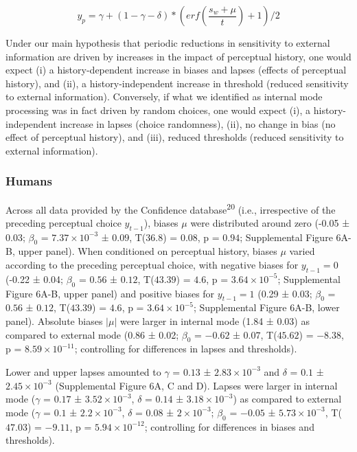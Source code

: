 \documentclass[
]{article}
\begin{document}
\begin{equation}
y_p = \gamma + (1 - \gamma - \delta) *  (erf(\frac{s_w + \mu}{t}) + 1) / 2
\end{equation}

Under our main hypothesis that periodic reductions in sensitivity to
external information are driven by increases in the impact of perceptual
history, one would expect (i) a history-dependent increase in biases and
lapses (effects of perceptual history), and (ii), a history-independent
increase in threshold (reduced sensitivity to external information).
Conversely, if what we identified as internal mode processing was in
fact driven by random choices, one would expect (i), a
history-independent increase in lapses (choice randomness), (ii), no
change in bias (no effect of perceptual history), and (iii), reduced
thresholds (reduced sensitivity to external information).

\hypertarget{humans}{%
\subsubsection{Humans}\label{humans}}

Across all data provided by the Confidence database\textsuperscript{20}
(i.e., irrespective of the preceding perceptual choice \(y_{t-1}\)),
biases \(\mu\) were distributed around zero (-0.05 ± 0.03; \(\beta_0\) =
\(\ensuremath{7.37\times 10^{-3}}\) ± \(0.09\), T(\(36.8\)) = \(0.08\),
p = \(0.94\); Supplemental Figure 6A-B, upper panel). When conditioned
on perceptual history, biases \(\mu\) varied according to the preceding
perceptual choice, with negative biases for \(y_{t-1} = 0\) (-0.22 ±
0.04; \(\beta_0\) = \(0.56\) ± \(0.12\), T(\(43.39\)) = \(4.6\), p =
\(\ensuremath{3.64\times 10^{-5}}\); Supplemental Figure 6A-B, upper
panel) and positive biases for \(y_{t-1} = 1\) (0.29 ± 0.03; \(\beta_0\)
= \(0.56\) ± \(0.12\), T(\(43.39\)) = \(4.6\), p =
\(\ensuremath{3.64\times 10^{-5}}\); Supplemental Figure 6A-B, lower
panel). Absolute biases \(|\mu|\) were larger in internal mode (1.84 ±
0.03) as compared to external mode (0.86 ± 0.02; \(\beta_0\) = \(-0.62\)
± \(0.07\), T(\(45.62\)) = \(-8.38\), p =
\(\ensuremath{8.59\times 10^{-11}}\); controlling for differences in
lapses and thresholds).

Lower and upper lapses amounted to \(\gamma\) = \(0.13\) ±
\(\ensuremath{2.83\times 10^{-3}}\) and \(\delta\) = \(0.1\) ±
\(\ensuremath{2.45\times 10^{-3}}\) (Supplemental Figure 6A, C and D).
Lapses were larger in internal mode (\(\gamma\) = \(0.17\) ±
\(\ensuremath{3.52\times 10^{-3}}\), \(\delta\) = \(0.14\) ±
\(\ensuremath{3.18\times 10^{-3}}\)) as compared to external mode
(\(\gamma\) = \(0.1\) ± \(\ensuremath{2.2\times 10^{-3}}\), \(\delta\) =
\(0.08\) ± \(\ensuremath{2\times 10^{-3}}\); \(\beta_0\) = \(-0.05\) ±
\(\ensuremath{5.73\times 10^{-3}}\), T(\(47.03\)) = \(-9.11\), p =
\(\ensuremath{5.94\times 10^{-12}}\); controlling for differences in
biases and thresholds).
\end{document}
